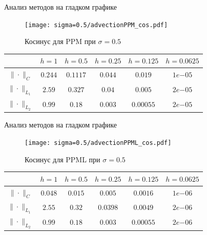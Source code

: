 \documentclass[unicode, 8pt]{beamer}
\begin{document}
    \begin{frame}{Анализ методов на гладком графике}
        \begin{figure}[h]
            \centering
            \texttt{[image: sigma=0.5/advectionPPM\_cos.pdf]}
            \caption{Косинус для PPM при $ \sigma = 0.5 $}
            \label{fig:ppm_cos_05}
        \end{figure}
        \begin{center}
            \begin{tabular}{ |c|c|c|c|c|c| } 
             \hline
             & $ h=1 $ &  $ h=0.5$ &  $ h=0.25 $ &  $ h=0.125 $ &  $ h=0.0625 $ \\ 
             \hline
             $\| \cdot \|_{C}$ & $0.244$ & $0.1117$ & $0.044$ & $0.019$ & $1e{-05}$
             \\
             \hline
             $\| \cdot \|_{L_1}$ & $2.59$ & $0.327$ & $0.04$ & $0.005$ & $2e{-05}$
             \\
             \hline
             $\| \cdot \|_{L_2}$ & $0.99$ & $0.18$ & $0.003$ & $0.00055$ & $2e{-05}$ 
             \\
             \hline
            \end{tabular}
        \end{center}
    \end{frame}

    \begin{frame}{Анализ методов на гладком графике}
        \begin{figure}[h]
            \centering
            \texttt{[image: sigma=0.5/advectionPPML\_cos.pdf]}
            \caption{Косинус для PPML при $ \sigma = 0.5 $}
            \label{fig:ppml_cos_05}
        \end{figure}
        \begin{center}
            \begin{tabular}{ |c|c|c|c|c|c| } 
             \hline
             & $ h=1 $ &  $ h=0.5$ &  $ h=0.25 $ &  $ h=0.125 $ &  $ h=0.0625 $ \\ 
             \hline
             $\| \cdot \|_{C}$ & $0.048$ & $0.015$ & $0.005$ & $0.0016$ & $1e{-06}$
             \\
             \hline
             $\| \cdot \|_{L_1}$ & $2.55$ & $0.32$ & $0.0398$ & $0.0049$ & $2e{-06}$
             \\
             \hline
             $\| \cdot \|_{L_2}$ & $0.99$ & $0.18$ & $0.003$ & $0.00055$ & $2e{-06}$ 
             \\
             \hline
            \end{tabular}
        \end{center}
    \end{frame}
\end{document}
